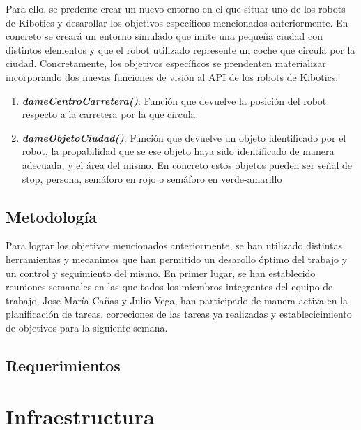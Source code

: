 \documentclass{report}
\begin{document}
Para ello, se predente crear un nuevo entorno en el que situar uno de los robots de Kibotics y desarollar los objetivos específicos mencionados anteriormente. En concreto se creará un entorno simulado que imite una pequeña ciudad con distintos elementos y que el robot utilizado represente un coche que circula por la ciudad. Concretamente, los objetivos específicos se prendenten materializar incorporando dos nuevas funciones de visión al API de los robots de Kibotics:

\begin{enumerate}
\item \textit{\textbf{dameCentroCarretera()}}: Función que devuelve la posición del robot respecto a la carretera por la que circula.
\item \textit{\textbf{ dameObjetoCiudad()}}: Función que devuelve un objeto identificado por el robot, la propabilidad que se ese objeto haya sido identificado de manera adecuada, y el área del mismo. En concreto estos objetos pueden ser señal de stop, persona, semáforo en rojo o semáforo en verde-amarillo
\end{enumerate}

\section{Metodología}
Para lograr los objetivos mencionados anteriormente, se han utilizado distintas herramientas y mecanimos que han permitido un desarollo óptimo del trabajo y un control y seguimiento del mismo. En primer lugar, se han establecido reuniones semanales en las que todos los miembros integrantes del equipo de trabajo, Jose María Cañas y Julio Vega, han participado de manera activa en la planificación de tareas, correciones de las tareas ya realizadas y establecicimiento de objetivos para la siguiente semana. 



\section{Requerimientos}

\chapter{Infraestructura}
\end{document}
